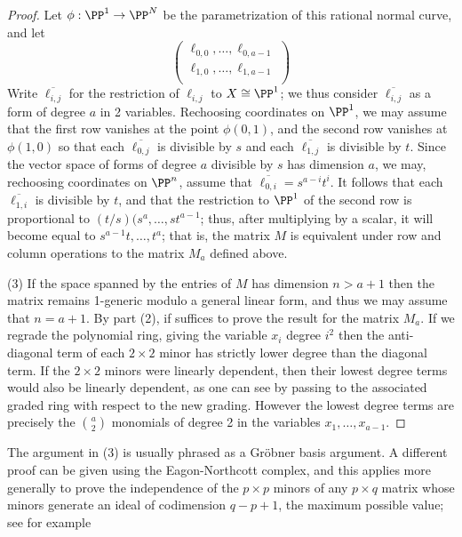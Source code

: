 \begin{proof}
Let $\phi: \PP^{1}\to \PP^{N}$ be the parametrization of this rational normal curve, and let
$$
\begin{pmatrix}
 \ell_{0,0},\dots, \ell_{0,a-1}\\
  \ell_{1,0},\dots, \ell_{1,a-1}\\
\end{pmatrix}
$$
 Write $\overline{\ell_{i,j}}$ for the restriction of $\ell_{i,j}$ to $X \cong \PP^{1}$; we thus consider
  $\overline{\ell_{i,j}}$ as a form of degree $a$ in 2 variables. 
 Rechoosing coordinates on $\PP^{1}$, we may assume that the first row vanishes at the point $\phi(0,1)$, and the second row vanishes at $\phi(1,0)$ so that each $\overline{\ell_{0,j}}$ is divisible by $s$ and each $\overline{\ell_{1,j}}$ is divisible by $t$. Since the vector space of forms of degree $a$ divisible by $s$ has dimension $a$, we may, rechoosing coordinates on $\PP^{n}$, assume that $\overline{\ell_{0,i}} = s^{a-i}t^{i}$. It follows that
each $\overline{\ell_{1,i}}$ is divisible by $t$, and that the restriction to $\PP^{1}$ of the second
row is proportional to $(t/s)(s^{a},\dots,st^{a-1}$; thus, after multiplying by a scalar, it will become
equal to $s^{a-1}t,\dots,t^{a}$; that is, the matrix $M$ is equivalent under row and column operations to the matrix $M_{a}$ defined above.

(3) If the space spanned by the entries of $M$ has dimension $n>a+1$ then the matrix remains 1-generic modulo a general linear form, and thus we may assume that $n=a+1$. By part (2), if suffices to prove
the result for the matrix $M_a$. If we regrade the polynomial ring, giving the variable $x_i$ degree $i^2$
then the anti-diagonal term of each $2\times 2$ minor has strictly lower degree than the diagonal term.
If the $2\times 2$ minors were linearly dependent, then their lowest degree terms would also be linearly dependent, as one can see by passing to the 
associated graded ring with respect to the new grading. However the lowest degree terms are precisely the ${a\choose 2}$ monomials of degree 2
in the variables $x_1, \dots, x_{a-1}$.
\end{proof}

\begin{fact}
The argument in (3) is usually phrased as a Gr\"obner basis argument. A different proof can be given using the Eagon-Northcott complex, and this
applies more generally to prove the independence of the $p\times p$ minors of any $p\times q$ matrix whose minors generate
an ideal of codimension $q-p+1$, the maximum possible value; see for example~\cite[Theorem ***]{Eisenbud1995}
\end{fact}

